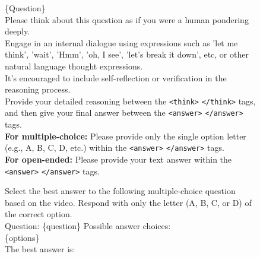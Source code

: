 \begin{figure}[h]
\begin{tcolorbox}[colback=black!7.5!white, colframe=black!80!white, title=All Benchmarks -- For Video-R1 and VideoRFT, fontupper=\footnotesize, fontlower=\footnotesize, fonttitle=\footnotesize]

\{Question\}\\
Please think about this question as if you were a human pondering deeply.\\
Engage in an internal dialogue using expressions such as 'let me think', 'wait', 'Hmm', 'oh, I see', 'let's break it down', etc, or other natural language thought expressions.\\
It's encouraged to include self-reflection or verification in the reasoning process.\\
Provide your detailed reasoning between the \texttt{<think>} \texttt{</think>} tags, and then give your final answer between the \texttt{<answer>} \texttt{</answer>} tags.\\
\textbf{For multiple-choice:} Please provide only the single option letter (e.g., A, B, C, D, etc.) within the \texttt{<answer>} \texttt{</answer>} tags.\\
\textbf{For open-ended:} Please provide your text answer within the \texttt{<answer>} \texttt{</answer>} tags.

\end{tcolorbox}

\end{figure}

\begin{figure}[h]
\begin{tcolorbox}[colback=black!7.5!white, colframe=black!80!white, title=Video-MME\space \textbar\space MVBench -- For Qwen series instruct models, fontupper=\footnotesize, fontlower=\footnotesize, fonttitle=\footnotesize]

Select the best answer to the following multiple-choice question based on the video.
Respond with only the letter (A, B, C, or D) of the correct option.\\
Question: \{question\} Possible answer choices:\\
\{options\}\\
The best answer is:
\end{tcolorbox}

\end{figure}


